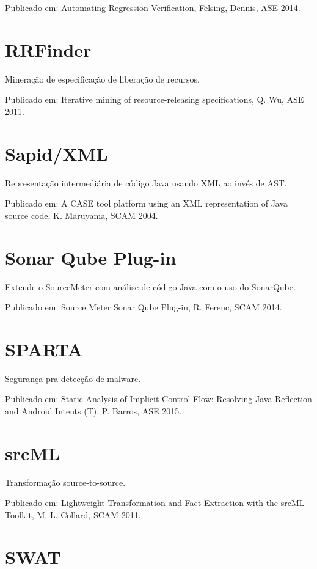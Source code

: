 Publicado em: Automating Regression Verification,
Felsing, Dennis,
ASE
2014.

\section{RRFinder}

Mineração de especificação de liberação de recursos.

Publicado em: Iterative mining of resource-releasing specifications,
Q. Wu,
ASE
2011.

\section{Sapid/XML}

Representação intermediária de código Java usando XML ao invés de AST.

Publicado em: A CASE tool platform using an XML representation of Java source code,
K. Maruyama,
SCAM
2004.

\section{Sonar Qube Plug-in}

Extende o SourceMeter com análise de código Java com o uso do SonarQube.

Publicado em: Source Meter Sonar Qube Plug-in,
R. Ferenc,
SCAM
2014.

\section{SPARTA}

Segurança pra detecção de malware.

Publicado em: Static Analysis of Implicit Control Flow: Resolving Java Reflection and Android Intents (T),
P. Barros,
ASE
2015.

\section{srcML}

Transformação source-to-source.

Publicado em: Lightweight Transformation and Fact Extraction with the srcML Toolkit,
M. L. Collard,
SCAM
2011.

\section{SWAT}

